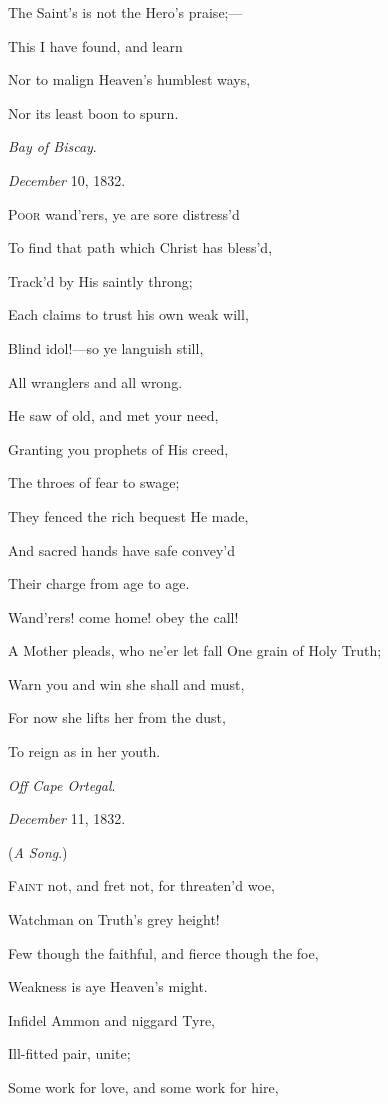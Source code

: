 The Saint's is not the Hero's praise;—

This I have found, and learn

Nor to malign Heaven's humblest ways,

Nor its least boon to spurn.

\emph{Bay of Biscay}.

\emph{December} 10, 1832.


P\textsc{oor} wand'rers, ye are sore distress'd

To find that path which Christ has bless'd,

Track'd by His saintly throng;

Each claims to trust his own weak will,

Blind idol!—so ye languish still,

All wranglers and all wrong.

He saw of old, and met your need,

Granting you prophets of His creed,

The throes of fear to swage;

They fenced the rich bequest He made,

And sacred hands have safe convey'd

Their charge from age to age.

Wand'rers! come home! obey the call!

A Mother pleads, who ne'er let fall One grain of Holy Truth;

Warn you and win she shall and must,

For now she lifts her from the dust,

To reign as in her youth.

\emph{Off Cape Ortegal}.

\emph{December} 11, 1832.


(\emph{A Song}.)

F\textsc{aint} not, and fret not, for threaten'd woe,

Watchman on Truth's grey height!

Few though the faithful, and fierce though the foe,

Weakness is aye Heaven's might.

Infidel Ammon and niggard Tyre,

Ill-fitted pair, unite;

Some work for love, and some work for hire,

